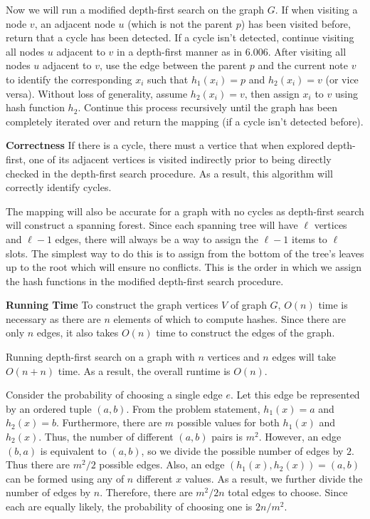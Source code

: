 \documentclass[12pt,twoside]{article}
\begin{document}
\begin{problems}
\begin{problemparts}
\begin{enumerate}[label=\textbf{(\roman*)}]
  Now we will run a modified depth-first search on the graph $G$. If when
  visiting a node $v$, an adjacent node $u$ (which is not the parent $p$) has
  been visited before, return that a cycle has been detected. If a cycle
  isn't detected, continue visiting all nodes $u$ adjacent to $v$ in a
  depth-first manner as in 6.006. After visiting all nodes $u$ adjacent to
  $v$, use the edge between the parent $p$ and the current note $v$ to
  identify the corresponding $x_i$ such that $h_1(x_i) = p$ and $h_2(x_i) =
  v$ (or vice versa). Without loss of generality, assume $h_2(x_i) = v$, then
  assign $x_i$ to $v$ using hash function $h_2$. Continue this process
  recursively until the graph has been completely iterated over and return
  the mapping (if a cycle isn't detected before).

  {\bf Correctness} If there is a cycle, there must a vertice that when
  explored depth-first, one of its adjacent vertices is visited indirectly
  prior to being directly checked in the depth-first search procedure. As a
  result, this algorithm will correctly identify cycles. 
  
  The mapping will also be accurate for a graph with no cycles as depth-first
  search will construct a spanning forest. Since each spanning tree will have
  $\ell$ vertices and $\ell - 1$ edges, there will always be a way to assign
  the $\ell - 1$ items to $\ell$ slots. The simplest way to do this is to
  assign from the bottom of the tree's leaves up to the root which will
  ensure no conflicts. This is the order in which we assign the hash
  functions in the modified depth-first search procedure.

  {\bf Running Time} To construct the graph vertices $V$ of graph $G$, $O(n)$
  time is necessary as there are $n$ elements of which to compute hashes.
  Since there are only $n$ edges, it also takes $O(n)$ time to construct the
  edges of the graph.

  Running depth-first search on a graph with $n$ vertices and $n$ edges will
  take $O(n + n)$ time. As a result, the overall runtime is $O(n)$.

\end{enumerate}

\problempart %

Consider the probability of choosing a single edge $e$. Let this edge be
represented by an ordered tuple $(a, b)$. From the problem statement,
$h_1(x) = a$ and $h_2(x) = b$. Furthermore, there are $m$ possible
values for both $h_1(x)$ and $h_2(x)$. Thus, the number of different
$(a, b)$ pairs is $m^2$. However, an edge $(b, a)$ is equivalent to
$(a, b)$, so we divide the possible number of edges by $2$. Thus there
are $m^2 / 2$ possible edges. Also, an edge $(h_1(x), h_2(x)) = (a, b)$ can
be formed using any of $n$ different $x$ values. As a result, we further
divide the number of edges by $n$. Therefore, there are $m^2 / 2n$ total
edges to choose. Since each are equally likely, the probability of choosing
one is $2n / m^2$.


\end{problemparts}
\end{problems}
\end{document}
